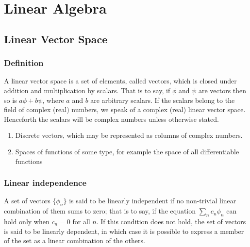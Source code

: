 \documentclass[cyan]{elegantnote}
\author{Yuyang Songsheng}
\begin{document}
\maketitle
\tableofcontents
\chapter{Linear Algebra}
\section{Linear Vector Space}
\subsection{Definition}
\begin{newdef}
A linear vector space is a set of elements, called vectors, which is closed under addition and multiplication by scalars. That is to say, if $\phi$ and $\psi$ are vectors then so is $a\phi+b\psi$, where $a$ and $b$ are arbitrary scalars. If the scalars belong to the field of complex (real) numbers, we speak of a complex (real) linear vector space. Henceforth the scalars will be complex numbers unless otherwise stated.
\end{newdef}

\begin{example}
\begin{enumerate}
\item Discrete vectors, which may be represented as columns of complex numbers.
\item Spaces of functions of some type, for example the space of all differentiable functions
\end{enumerate}
\end{example}

\subsection{Linear independence}
\begin{newdef}
A set of vectors $\{\phi_n\}$ is said to be linearly independent if no non-trivial linear combination of them sums to zero; that is to say, if the equation $\sum_{n} c_n \phi_n$ can hold only when $c_n=0$ for all $n$. If this condition does not hold, the set of vectors is said to be linearly dependent, in which case it is possible to express a member of the set as a linear combination of the others.
\end{newdef}
\end{document}
